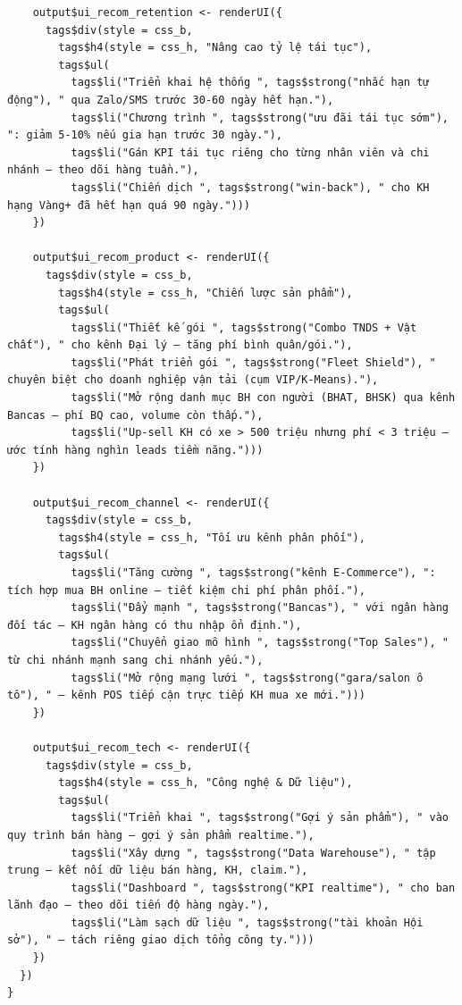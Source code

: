 \documentclass[12pt, a4paper]{article}
\begin{document}
\begin{lstlisting}
    output$ui_recom_retention <- renderUI({
      tags$div(style = css_b,
        tags$h4(style = css_h, "Nâng cao tỷ lệ tái tục"),
        tags$ul(
          tags$li("Triển khai hệ thống ", tags$strong("nhắc hạn tự động"), " qua Zalo/SMS trước 30-60 ngày hết hạn."),
          tags$li("Chương trình ", tags$strong("ưu đãi tái tục sớm"), ": giảm 5-10% nếu gia hạn trước 30 ngày."),
          tags$li("Gán KPI tái tục riêng cho từng nhân viên và chi nhánh — theo dõi hàng tuần."),
          tags$li("Chiến dịch ", tags$strong("win-back"), " cho KH hạng Vàng+ đã hết hạn quá 90 ngày.")))
    })

    output$ui_recom_product <- renderUI({
      tags$div(style = css_b,
        tags$h4(style = css_h, "Chiến lược sản phẩm"),
        tags$ul(
          tags$li("Thiết kế gói ", tags$strong("Combo TNDS + Vật chất"), " cho kênh Đại lý — tăng phí bình quân/gói."),
          tags$li("Phát triển gói ", tags$strong("Fleet Shield"), " chuyên biệt cho doanh nghiệp vận tải (cụm VIP/K-Means)."),
          tags$li("Mở rộng danh mục BH con người (BHAT, BHSK) qua kênh Bancas — phí BQ cao, volume còn thấp."),
          tags$li("Up-sell KH có xe > 500 triệu nhưng phí < 3 triệu — ước tính hàng nghìn leads tiềm năng.")))
    })

    output$ui_recom_channel <- renderUI({
      tags$div(style = css_b,
        tags$h4(style = css_h, "Tối ưu kênh phân phối"),
        tags$ul(
          tags$li("Tăng cường ", tags$strong("kênh E-Commerce"), ": tích hợp mua BH online — tiết kiệm chi phí phân phối."),
          tags$li("Đẩy mạnh ", tags$strong("Bancas"), " với ngân hàng đối tác — KH ngân hàng có thu nhập ổn định."),
          tags$li("Chuyển giao mô hình ", tags$strong("Top Sales"), " từ chi nhánh mạnh sang chi nhánh yếu."),
          tags$li("Mở rộng mạng lưới ", tags$strong("gara/salon ô tô"), " — kênh POS tiếp cận trực tiếp KH mua xe mới.")))
    })

    output$ui_recom_tech <- renderUI({
      tags$div(style = css_b,
        tags$h4(style = css_h, "Công nghệ & Dữ liệu"),
        tags$ul(
          tags$li("Triển khai ", tags$strong("Gợi ý sản phẩm"), " vào quy trình bán hàng — gợi ý sản phẩm realtime."),
          tags$li("Xây dựng ", tags$strong("Data Warehouse"), " tập trung — kết nối dữ liệu bán hàng, KH, claim."),
          tags$li("Dashboard ", tags$strong("KPI realtime"), " cho ban lãnh đạo — theo dõi tiến độ hàng ngày."),
          tags$li("Làm sạch dữ liệu ", tags$strong("tài khoản Hội sở"), " — tách riêng giao dịch tổng công ty.")))
    })
  })
}
\end{lstlisting}
\newpage
\end{document}
